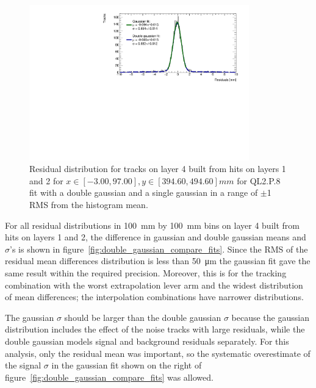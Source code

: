 
\begin{figure}
    \centering
    \includegraphics[width = 0.85\textwidth]{figures/figure_double_gaus_vs_gaus_example_fit_QL2P08_3100V_2021-06-18_and_2021-07-19_xbin_10_ybin_5_layer4_fixedlayers12.pdf}
    \caption{Residual distribution for tracks on layer 4 built from hits on layers 1 and 2 for $x\in\left[-3.00, 97.00\right],  y\in\left[394.60, 494.60\right] mm$ for QL2.P.8 fit with a double gaussian and a single gaussian in a range of $\pm$1 RMS from the histogram mean.}
    \label{fig:double_gaussian_example_fit}
\end{figure}

For all residual distributions in \SI{100}{\milli\meter} by \SI{100}{\milli\meter} bins on layer 4 built from hits on layers 1 and 2, the difference in gaussian and double gaussian means and $\sigma$'s is shown in figure~\ref{fig:double_gaussian_compare_fits}. Since the RMS of the residual mean differences distribution is less than \SI{50}{\micro\meter} the gaussian fit gave the same result within the required precision. Moreover, this is for the tracking combination with the worst extrapolation lever arm and the widest distribution of mean differences; the interpolation combinations have narrower distributions. 

The gaussian $\sigma$ should be larger than the double gaussian $\sigma$ because the gaussian distribution includes the effect of the noise tracks with large residuals, while the double gaussian models signal and background residuals separately. For this analysis, only the residual mean was important, so the systematic overestimate of the signal $\sigma$ in the gaussian fit shown on the right of figure~\ref{fig:double_gaussian_compare_fits} was allowed.

